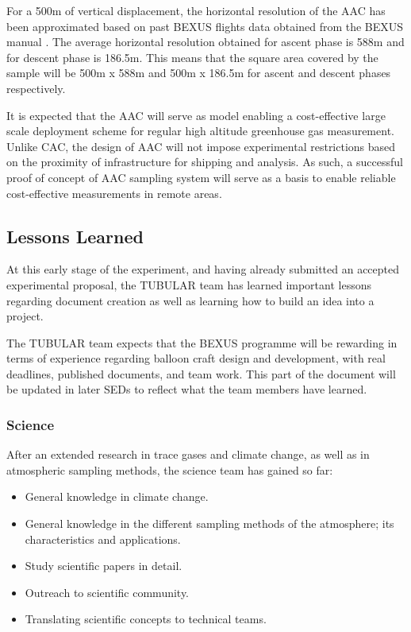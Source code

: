 \documentclass[a4paper,12pt,twoside]{article}
\begin{document}
For a 500m of vertical displacement, the horizontal resolution of the AAC has been approximated based on past BEXUS flights data obtained from the BEXUS manual \cite{BexusManual}. The average horizontal resolution obtained for ascent phase is 588m and for descent phase is 186.5m. This means that the square area covered by the sample will be 500m x 588m and 500m x 186.5m for ascent and descent phases respectively.



It is expected that the AAC will serve as model enabling a cost-effective large scale deployment scheme for regular high altitude greenhouse gas measurement. Unlike CAC, the design of AAC will not impose experimental restrictions based on the proximity of infrastructure for shipping and analysis. As such, a successful proof of concept of AAC sampling system will serve as a basis to enable reliable cost-effective measurements in remote areas.


 
\pagebreak
\subsection{Lessons Learned}
At this early stage of the experiment, and having already submitted an accepted experimental proposal, the TUBULAR team has learned important lessons regarding document creation as well as learning how to build an idea into a project. \par
The TUBULAR team expects that the BEXUS programme will be rewarding in terms of experience regarding balloon craft design and development, with real deadlines, published documents, and team work. This part of the document will be updated in later SEDs to reflect what the team members have learned.

\subsubsection{Science}
After an extended research in trace gases and climate change, as well as in atmospheric sampling methods, the science team has gained so far: 
\begin{itemize}
    \item General knowledge in climate change.
    \item General knowledge in the different sampling methods of the atmosphere; its characteristics and applications.
    \item Study scientific papers in detail.
    \item Outreach to scientific community.
    \item Translating scientific concepts to technical teams.
\end{itemize}
\end{document}
